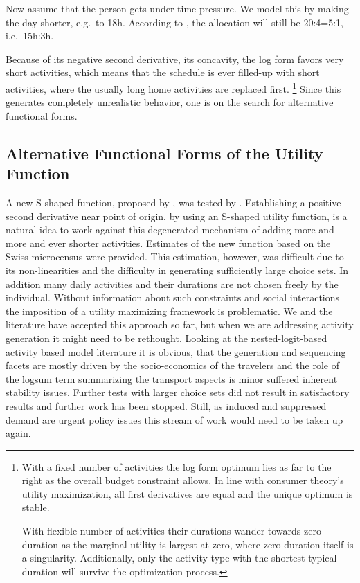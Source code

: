 Now assume that the person gets under time pressure.  We model this by making the day shorter, e.g.\ to 18h.  According to , the allocation will still be 20:4=5:1, i.e.\ 15h:3h.  

 
Because of its negative second derivative, \ie its concavity, the log form favors very short activities, which means that the schedule is ever filled-up with short activities, where the usually long home activities are replaced first.%
\footnote{
With a fixed number of activities the log form optimum lies as far to the right as the overall budget constraint allows. 
In line with consumer theory's utility maximization, all first derivatives are equal and the unique optimum is stable.

With flexible number of activities their durations wander towards zero duration as the marginal utility is largest at zero, where zero duration itself is a singularity. 
Additionally, only the activity type with the shortest typical duration will survive the optimization process.} 
%
Since this generates completely unrealistic behavior, one is on the search for alternative functional forms. 


\subsection{Alternative Functional Forms of the Utility Function}
\label{sec:alternative-functions}
A new S-shaped function, proposed by \citet[][]{Joh_PhDThesis_2004}, was tested by \citet[][p.129ff]{Feil_PhDThesis_2010}. 
Establishing a positive second derivative near point of origin, by using an S-shaped utility function, is a natural idea to work against this degenerated mechanism of adding more and more and ever shorter activities. 
Estimates of the new function based on the Swiss microcensus were provided. 
This estimation, however, was difficult due to its non-linearities and the difficulty in generating sufficiently large choice sets. 
In addition many daily activities and their durations are not chosen freely by the individual. 
Without information about such constraints and social interactions the imposition of a utility maximizing framework is problematic. 
We and the literature have accepted this approach so far, but when we are addressing activity generation it might need to be rethought. 
Looking at the nested-logit-based activity based model literature it is obvious, that the generation and sequencing facets are mostly driven by the socio-economics of the travelers and the role of the logsum term summarizing the transport aspects is minor suffered inherent stability issues. 
Further tests with larger choice sets did not result in satisfactory results and further work has been stopped. 
Still, as induced and suppressed demand are urgent policy issues this stream of work would need to be taken up again. 

